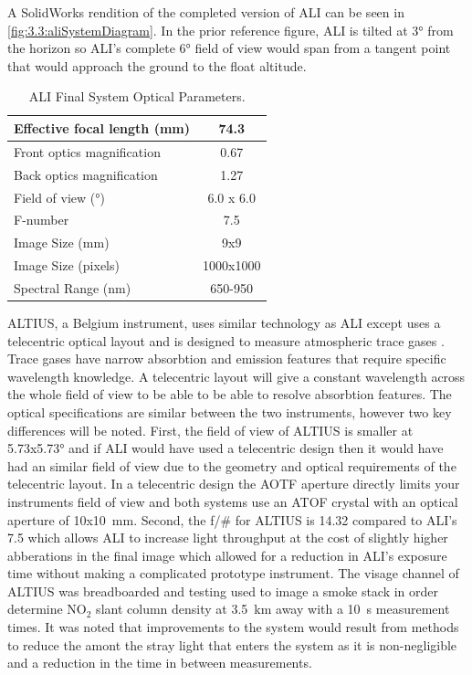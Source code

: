 \documentclass[12pt]{article}
\begin{document}
A SolidWorks rendition of the completed version of ALI can be seen in \autoref{fig:3.3:aliSystemDiagram}. In the prior reference figure, ALI is tilted at 3\si{\degree} from the horizon so ALI's complete 6\si{\degree} field of view would span from a tangent point that would approach the ground to the float altitude.

\begin{table}[!ht]
    \begin{center}
    \begin{tabular}{|l|c|}
      \hline
      Effective focal length (mm) & 74.3 \\
      \hline
      Front optics magnification & 0.67 \\
      \hline
      Back optics magnification & 1.27 \\
      \hline
      Field of view (\si{\degree}) & 6.0 x 6.0 \\
      \hline
      F-number & 7.5 \\
      \hline
      Image Size (mm) & 9x9\\
      \hline
      Image Size (pixels) & 1000x1000\\
      \hline
      Spectral Range (nm) & 650-950\\
      \hline
    \end{tabular}
    \end{center}
    \caption{ALI Final System Optical Parameters.}
    \label{tab:3.2:ALISystemParameters}
\end{table}

ALTIUS, a Belgium instrument, uses similar technology as ALI except uses a telecentric optical layout and is designed to measure atmospheric trace gases \citep{Dekemper2012}. Trace gases have narrow absorbtion and emission features that require specific wavelength knowledge. A telecentric layout will give a constant wavelength across the whole field of view to be able to be able to resolve absorbtion features. The optical specifications are similar between the two instruments, however two key differences will be noted. First, the field of view of ALTIUS is smaller at 5.73x5.73\si{\degree} and if ALI would have used a telecentric design then it would have had an similar field of view due to the geometry and optical requirements of the telecentric layout. In a telecentric design the AOTF aperture directly limits your instruments field of view and both systems use an ATOF crystal with an optical aperture of 10x10~mm. Second, the f/\# for ALTIUS is 14.32 compared to ALI's 7.5 which allows ALI to increase light throughput at the cost of slightly higher abberations in the final image which allowed for a reduction in ALI's exposure time without making a complicated prototype instrument. The visage channel of ALTIUS was breadboarded and testing used to image a smoke stack in order determine NO$_{2}$ slant column density at 3.5~km away with a 10~s measurement times. It was noted that improvements to the system would result from methods to reduce the amont the stray light that enters the system as it is non-negligible and a reduction in the time in between measurements.
\end{document}
